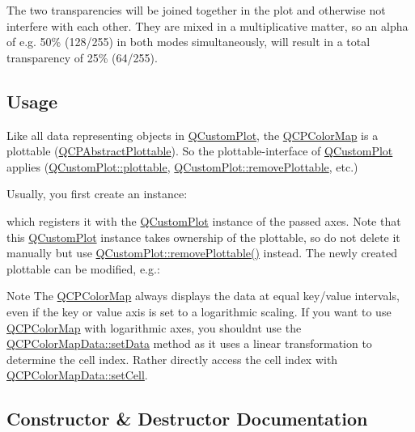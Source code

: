 The two transparencies will be joined together in the plot and otherwise not interfere with each other. They are mixed in a multiplicative matter, so an alpha of e.\+g. 50\% (128/255) in both modes simultaneously, will result in a total transparency of 25\% (64/255).\hypertarget{classQCPColorMap_qcpcolormap-usage}{}\subsection{Usage}\label{classQCPColorMap_qcpcolormap-usage}
Like all data representing objects in \hyperlink{classQCustomPlot}{Q\+Custom\+Plot}, the \hyperlink{classQCPColorMap}{Q\+C\+P\+Color\+Map} is a plottable (\hyperlink{classQCPAbstractPlottable}{Q\+C\+P\+Abstract\+Plottable}). So the plottable-\/interface of \hyperlink{classQCustomPlot}{Q\+Custom\+Plot} applies (\hyperlink{classQCustomPlot_a32de81ff53e263e785b83b52ecd99d6f}{Q\+Custom\+Plot\+::plottable}, \hyperlink{classQCustomPlot_af3dafd56884208474f311d6226513ab2}{Q\+Custom\+Plot\+::remove\+Plottable}, etc.)

Usually, you first create an instance\+: 
\begin{DoxyCodeInclude}
\end{DoxyCodeInclude}
which registers it with the \hyperlink{classQCustomPlot}{Q\+Custom\+Plot} instance of the passed axes. Note that this \hyperlink{classQCustomPlot}{Q\+Custom\+Plot} instance takes ownership of the plottable, so do not delete it manually but use \hyperlink{classQCustomPlot_af3dafd56884208474f311d6226513ab2}{Q\+Custom\+Plot\+::remove\+Plottable()} instead. The newly created plottable can be modified, e.\+g.\+: 
\begin{DoxyCodeInclude}
\end{DoxyCodeInclude}
 \begin{DoxyNote}{Note}
The \hyperlink{classQCPColorMap}{Q\+C\+P\+Color\+Map} always displays the data at equal key/value intervals, even if the key or value axis is set to a logarithmic scaling. If you want to use \hyperlink{classQCPColorMap}{Q\+C\+P\+Color\+Map} with logarithmic axes, you shouldn\textquotesingle{}t use the \hyperlink{classQCPColorMapData_afd2083ccfd6987ec94aa7ef8e91ca39a}{Q\+C\+P\+Color\+Map\+Data\+::set\+Data} method as it uses a linear transformation to determine the cell index. Rather directly access the cell index with \hyperlink{classQCPColorMapData_a8e75eaf8746596319032a93f3d2d0683}{Q\+C\+P\+Color\+Map\+Data\+::set\+Cell}. 
\end{DoxyNote}


\subsection{Constructor \& Destructor Documentation}
\mbox{\label{classQCPColorMap_aa37e976d2ee1e2be6c4cd88a64b36215}} 
